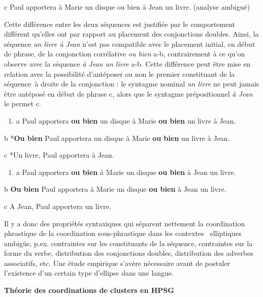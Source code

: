   c  Paul apportera à Marie un disque ou bien à Jean un livre. (analyse ambiguë)

Cette différence entre les deux séquences est justifiée par le comportement différent qu'elles ont par rapport au placement des conjonctions doubles. Ainsi, la séquence \textit{un livre à Jean} n'est pas compatible avec le placement initial, en début de phrase, de la conjonction corrélative \textit{ou bien} a-b, contrairement à ce qu'on observe avec la séquence \textit{à Jean un livre} a-b. Cette différence peut être mise en relation avec la possibilité d'antéposer ou non le premier constituant de la séquence~à droite de la conjonction : le syntagme nominal \textit{un livre} ne peut jamais être antéposé en début de phrase c, alors que le syntagme prépositionnel \textit{à Jean} le permet c.  


\begin{enumerate}
\item \label{bkm:Ref290364941}a   Paul apportera \textbf{ou bien} un disque à Marie \textbf{ou bien} un livre à Jean. 


\end{enumerate}
  b  *\textbf{Ou bien} Paul apportera un disque à Marie \textbf{ou bien} un livre à Jean.

  c  *Un livre, Paul apportera à Jean.


\begin{enumerate}
\item \label{bkm:Ref290364944}a   Paul apportera \textbf{ou bien} à Marie un disque \textbf{ou bien} à Jean un livre. 


\end{enumerate}
  b  \textbf{Ou bien} Paul apportera à Marie un disque \textbf{ou bien} à Jean un livre. 

  c  A Jean, Paul apportera un livre. 

Il y a donc des propriétés syntaxiques qui séparent nettement la coordination phrastique de la coordination sous-phrastique dans les contextes {\guillemotleft}~elliptiques~{\guillemotright} ambigüs, p.ex. contraintes sur les constituants de la séquence, contraintes sur la forme du verbe, distribution des conjonctions doubles, distribution des adverbes associatifs, etc. Une étude empirique s'avère nécessaire avant de postuler l'existence d'un certain type d'ellipse dans une langue.

{\bfseries
\label{bkm:Ref302392744}\label{bkm:Ref290312423}Théorie des coordinations de clusters en HPSG}

